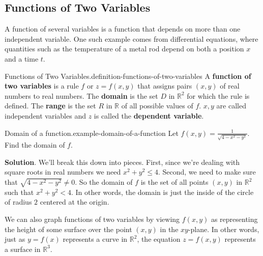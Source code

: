 \documentclass[10pt,]{book}
\newcommand{\terminology}[1]{\textbf{#1}}
\numberwithin{equation}{section}
\newcommand{\RR}{\mathbb{R}}
\begin{document}
\subsection[{Functions of Two Variables}]{Functions of Two Variables}\label{subsection-functions-of-two-variables}
\hypertarget{p-1328}{}%
A function of several variables is a function that depends on more than one independent variable. One such example comes from differential equations, where quantities such as the temperature of a metal rod depend on both a position \(x\) and a time \(t\).%
\begin{definition}{Functions of Two Variables.}{definition-functions-of-two-variables}%
\hypertarget{p-1329}{}%
A \terminology{function of two variables} is a rule \(f\) or \(z = f(x,y)\) that assigns pairs \((x,y)\) of real numbers to real numbers. The \terminology{domain} is the set \(D\) in \(\RR^{2}\) for which the rule is defined. The \terminology{range} is the set \(R\) in \(\RR\) of all possible values of \(f\). \(x,y\) are called independent variables and \(z\) is called the \terminology{dependent variable}.%
\end{definition}
\begin{example}{Domain of a function.}{example-domain-of-a-function}%
\hypertarget{p-1330}{}%
Let \(f(x,y) = \frac{1}{\sqrt{4 - x^{2} - y^{2}}}\). Find the domain of \(f\).%
\par\smallskip%
\noindent\textbf{Solution}.\hypertarget{solution-211}{}\quad%
\hypertarget{p-1331}{}%
We'll break this down into pieces. First, since we're dealing with square roots in real numbers we need \(x^{2}+y^{2}\leq4\). Second, we need to make sure that \(\sqrt{4 - x^{2} - y^{2}}\neq0\). So the domain of \(f\) is the set of all points \((x,y)\) in \(\RR^{2}\) such that \(x^{2} + y^{2} < 4\). In other words, the domain is just the inside of the circle of radius \(2\) centered at the origin.%
\end{example}
\hypertarget{p-1332}{}%
We can also graph functions of two variables by viewing \(f(x,y)\) as representing the height of some surface over the point \((x,y)\) in the \(xy\)-plane. In other words, just as \(y = f(x)\) represents a curve in \(\RR^{2}\), the equation \(z = f(x,y)\) represents a surface in \(\RR^{3}\).%
\end{document}
